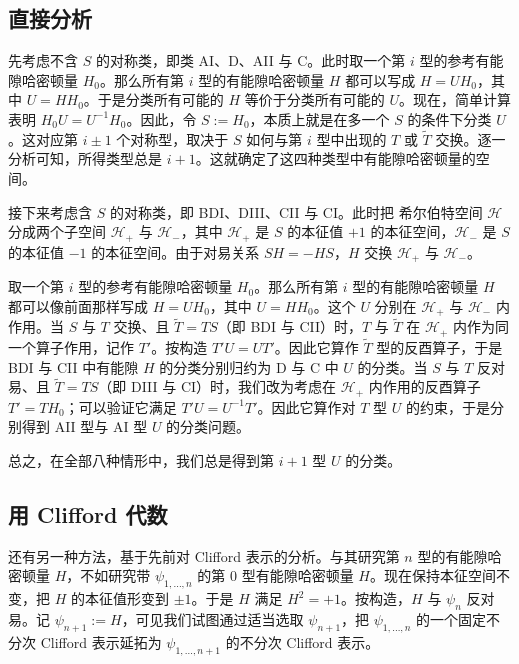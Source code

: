 \subsection{直接分析}

先考虑不含 $S$ 的对称类，即类 AI、D、AII 与 C。此时取一个第 $i$ 型的参考有能隙哈密顿量 $H_0$。那么所有第 $i$ 型的有能隙哈密顿量 $H$ 都可以写成 $H=UH_0$，其中 $U=HH_0$。于是分类所有可能的 $H$ 等价于分类所有可能的 $U$。现在，简单计算表明 $H_0U=U^{-1}H_0$。因此，令 $S:=H_0$，本质上就是在多一个 $S$ 的条件下分类 $U$。这对应第 $i\pm1$ 个对称型，取决于 $S$ 如何与第 $i$ 型中出现的 $T$ 或 $\tilde T$ 交换。逐一分析可知，所得类型总是 $i+1$。这就确定了这四种类型中有能隙哈密顿量的空间。

接下来考虑含 $S$ 的对称类，即 BDI、DIII、CII 与 CI。此时把 希尔伯特空间 $\mathcal{H}$ 分成两个子空间 $\mathcal{H}_+$ 与 $\mathcal{H}_-$，其中 $\mathcal{H}_+$ 是 $S$ 的本征值 $+1$ 的本征空间，$\mathcal{H}_-$ 是 $S$ 的本征值 $-1$ 的本征空间。由于对易关系 $SH=-HS$，$H$ 交换 $\mathcal{H}_+$ 与 $\mathcal{H}_-$。

取一个第 $i$ 型的参考有能隙哈密顿量 $H_0$。那么所有第 $i$ 型的有能隙哈密顿量 $H$ 都可以像前面那样写成 $H=UH_0$，其中 $U=HH_0$。这个 $U$ 分别在 $\mathcal{H}_+$ 与 $\mathcal{H}_-$ 内作用。当 $S$ 与 $T$ 交换、且 $\tilde T=TS$（即 BDI 与 CII）时，$T$ 与 $\tilde T$ 在 $\mathcal{H}_+$ 内作为同一个算子作用，记作 $T'$。按构造 $T'U=UT'$。因此它算作 $\tilde T$ 型的反酉算子，于是 BDI 与 CII 中有能隙 $H$ 的分类分别归约为 D 与 C 中 $U$ 的分类。当 $S$ 与 $T$ 反对易、且 $\tilde T=TS$（即 DIII 与 CI）时，我们改为考虑在 $\mathcal{H}_+$ 内作用的反酉算子 $T'=TH_0$；可以验证它满足 $T'U=U^{-1}T'$。因此它算作对 $T$ 型 $U$ 的约束，于是分别得到 AII 型与 AI 型 $U$ 的分类问题。

总之，在全部八种情形中，我们总是得到第 $i+1$ 型 $U$ 的分类。

\subsection{用 Clifford 代数}

还有另一种方法，基于先前对 Clifford 表示的分析。与其研究第 $n$ 型的有能隙哈密顿量 $H$，不如研究带 $\psi_{1,\ldots,n}$ 的第 $0$ 型有能隙哈密顿量 $H$。现在保持本征空间不变，把 $H$ 的本征值形变到 $\pm1$。于是 $H$ 满足 $H^2=+1$。按构造，$H$ 与 $\psi_n$ 反对易。记 $\psi_{n+1}:=H$，可见我们试图通过适当选取 $\psi_{n+1}$，把 $\psi_{1,\ldots,n}$ 的一个固定不分次 Clifford 表示延拓为 $\psi_{1,\ldots,n+1}$ 的不分次 Clifford 表示。

